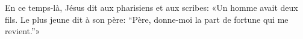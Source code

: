 En ce temps-là, Jésus dit aux pharisiens et aux scribes:
	«Un homme avait deux fils.
Le plus jeune dit à son père:
	“Père, donne-moi la part de fortune qui me revient.”»
